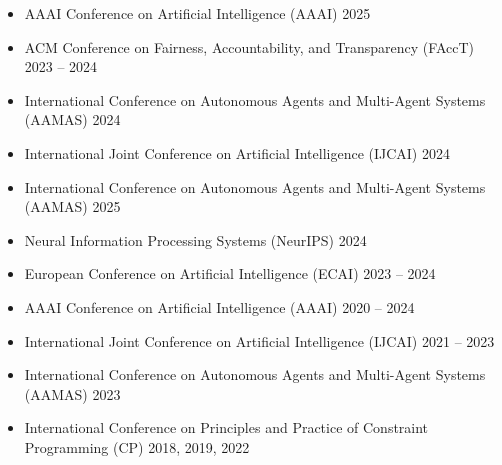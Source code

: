 

\begin{itemize}
  \item AAAI Conference on Artificial Intelligence (AAAI) \hfill {2025}  
  \item ACM Conference on Fairness, Accountability, and Transparency (FAccT) \hfill {2023 -- 2024}
  \item International Conference on Autonomous Agents and Multi-Agent Systems (AAMAS) \hfill {2024}
  \item International Joint Conference on Artificial Intelligence (IJCAI) \hfill {2024}
  \item International Conference on Autonomous Agents and Multi-Agent Systems (AAMAS) \hfill {2025}
  \item Neural Information Processing Systems (NeurIPS)  \hfill {2024}
  \item European Conference on Artificial Intelligence (ECAI) \hfill {2023 -- 2024}
\end{itemize}

\begin{itemize}
  \item AAAI Conference on Artificial Intelligence (AAAI) \hfill {2020 -- 2024}
  \item International Joint Conference on Artificial Intelligence (IJCAI) \hfill {2021 -- 2023}
  \item International Conference on Autonomous Agents and Multi-Agent Systems (AAMAS) \hfill {2023}
  \item International Conference on Principles and Practice of Constraint Programming (CP) \hfill{2018, 2019, 2022} 
\end{itemize}

